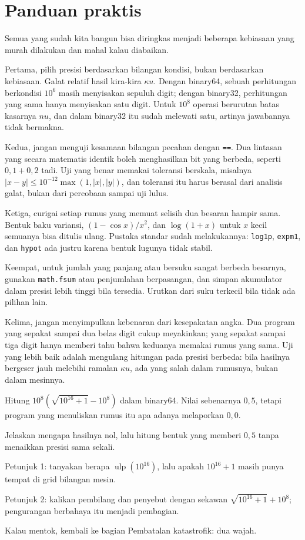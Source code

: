 \section{Panduan praktis}

Semua yang sudah kita bangun bisa diringkas menjadi beberapa kebiasaan yang murah
dilakukan dan mahal kalau diabaikan.

Pertama, pilih presisi berdasarkan bilangan kondisi, bukan berdasarkan kebiasaan.
Galat relatif hasil kira-kira $\kappa u$. Dengan binary64, sebuah perhitungan
berkondisi $10^{6}$ masih menyisakan sepuluh digit; dengan binary32, perhitungan yang
sama hanya menyisakan satu digit. Untuk $10^{8}$ operasi berurutan batas kasarnya
$nu$, dan dalam binary32 itu sudah melewati satu, artinya jawabannya tidak bermakna.

Kedua, jangan menguji kesamaan bilangan pecahan dengan \texttt{==}. Dua lintasan yang
secara matematis identik boleh menghasilkan bit yang berbeda, seperti
$0{,}1+0{,}2$ tadi. Uji yang benar memakai toleransi berskala, misalnya
$|x-y|\le10^{-12}\max(1,|x|,|y|)$, dan toleransi itu harus berasal dari analisis
galat, bukan dari percobaan sampai uji lulus.

Ketiga, curigai setiap rumus yang memuat selisih dua besaran hampir sama. Bentuk baku
variansi, $(1-\cos x)/x^{2}$, dan $\log(1+x)$ untuk $x$ kecil semuanya bisa ditulis
ulang. Pustaka standar sudah melakukannya: \texttt{log1p}, \texttt{expm1}, dan
\texttt{hypot} ada justru karena bentuk lugunya tidak stabil.

Keempat, untuk jumlah yang panjang atau bersuku sangat berbeda besarnya, gunakan
\texttt{math.fsum} atau penjumlahan berpasangan, dan simpan akumulator dalam presisi
lebih tinggi bila tersedia. Urutkan dari suku terkecil bila tidak ada pilihan lain.

Kelima, jangan menyimpulkan kebenaran dari kesepakatan angka. Dua program yang sepakat
sampai dua belas digit cukup meyakinkan; yang sepakat sampai tiga digit hanya memberi
tahu bahwa keduanya memakai rumus yang sama. Uji yang lebih baik adalah mengulang
hitungan pada presisi berbeda: bila hasilnya bergeser jauh melebihi ramalan
$\kappa u$, ada yang salah dalam rumusnya, bukan dalam mesinnya.


\pagebreak[4]
\begin{tantangan}
Hitung $10^{8}\left(\sqrt{10^{16}+1}-10^{8}\right)$ dalam binary64. Nilai sebenarnya
$0{,}5$, tetapi program yang menuliskan rumus itu apa adanya melaporkan $0{,}0$.

Jelaskan mengapa hasilnya nol, lalu hitung bentuk yang memberi $0{,}5$ tanpa menaikkan
presisi sama sekali.

Petunjuk 1: tanyakan berapa $\operatorname{ulp}(10^{16})$, lalu apakah $10^{16}+1$
masih punya tempat di grid bilangan mesin.

Petunjuk 2: kalikan pembilang dan penyebut dengan sekawan
$\sqrt{10^{16}+1}+10^{8}$; pengurangan berbahaya itu menjadi pembagian.

Kalau mentok, kembali ke bagian Pembatalan katastrofik: dua wajah.
\end{tantangan}

